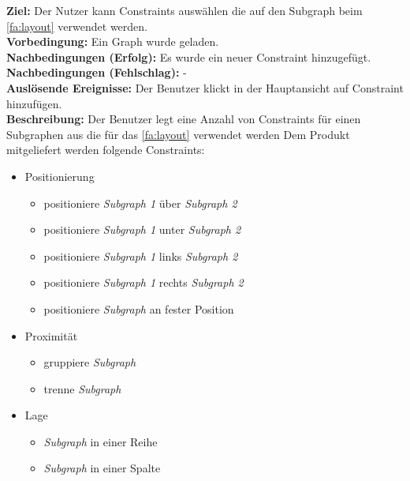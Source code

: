\label{fa:constraints}
\textbf{Ziel:} Der Nutzer kann Constraints auswählen die auf den Subgraph beim \ref{fa:layout} verwendet werden.\\
\textbf{Vorbedingung:} Ein Graph wurde geladen.\\
\textbf{Nachbedingungen (Erfolg):} Es wurde ein neuer Constraint hinzugefügt.\\
\textbf{Nachbedingungen (Fehlschlag):} -\\
\textbf{Auslösende Ereignisse:} Der Benutzer klickt in der Hauptansicht auf Constraint hinzufügen.\\
\textbf{Beschreibung: }
Der Benutzer legt eine Anzahl von Constraints für einen Subgraphen aus die für das \ref{fa:layout} verwendet werden
Dem Produkt mitgeliefert werden folgende Constraints: %
\begin{itemize}[nolistsep]
  \item Positionierung
  \begin{itemize}[nolistsep]
    \item positioniere \textit{Subgraph 1} über \textit{Subgraph 2}
    \item positioniere \textit{Subgraph 1} unter \textit{Subgraph 2}
    \item positioniere \textit{Subgraph 1} links \textit{Subgraph 2}
    \item positioniere \textit{Subgraph 1} rechts \textit{Subgraph 2}
    \item positioniere \textit{Subgraph} an fester Position
  \end{itemize}
  \item Proximität
  \begin{itemize}[nolistsep]
    \item gruppiere \textit{Subgraph}
    \item trenne \textit{Subgraph}
  \end{itemize}
  \item Lage
  \begin{itemize}[nolistsep]
    \item \textit{Subgraph} in einer Reihe
    \item \textit{Subgraph} in einer Spalte
  \end{itemize}
\end{itemize}

